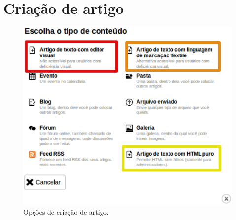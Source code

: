 \section{Criação de artigo}

\begin{figure}[H]
     \centering
       \includegraphics[keepaspectratio=true,scale=0.49]{figuras/criandoArtigo.eps}
     \caption{Opções de criação de artigo.}
     \label{fig:FormCriacaoPasta}
\end{figure}